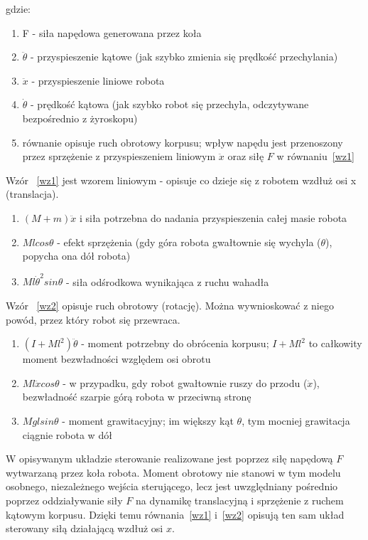 \documentclass[12pt,twoside]{article}
\begin{document}
gdzie:

\begin{enumerate}
    \item[-] F - siła napędowa generowana przez koła
    \item[-] $\ddot{\theta}$ - przyspieszenie kątowe (jak szybko zmienia się prędkość przechylania)
    \item[-] $\ddot{x}$ - przyspieszenie liniowe robota 
    \item[-] $\dot{\theta}$ - prędkość kątowa (jak szybko robot się przechyla, odczytywane bezpośrednio z żyroskopu)
    \item[-] równanie opisuje ruch obrotowy korpusu; wpływ napędu jest przenoszony przez sprzężenie z przyspieszeniem liniowym $\ddot{x}$ oraz siłę $F$ w równaniu~\eqref{wz1}
\end{enumerate}

Wzór ~\ref{wz1} jest wzorem liniowym - opisuje co dzieje się z robotem wzdłuż osi x (translacja). 

\begin{enumerate}
    \item[-] $(M+m)\ddot{x}$ i siła potrzebna do nadania przyspieszenia całej masie robota
    \item[-] $Mlcos\theta$ - efekt sprzężenia (gdy góra robota gwałtownie się wychyla ($\theta$), popycha ona dół robota)
    \item[-] $Ml\dot{\theta}^2sin\theta$ - siła odśrodkowa wynikająca z ruchu wahadła
\end{enumerate}

Wzór ~\ref{wz2} opisuje ruch obrotowy (rotację). Można wywnioskować z niego powód, przez który robot się przewraca.

\begin{enumerate}
    \item[-] $(I+Ml^2)\ddot{\theta}$ - moment potrzebny do obrócenia korpusu; $I+Ml^2$ to całkowity moment bezwładności względem osi obrotu
    \item[-] $Ml\ddot{x}cos\theta$ - w przypadku, gdy robot gwałtownie ruszy do przodu ($\ddot{x}$), bezwładność szarpie górą robota w przeciwną stronę
    \item[-] $Mglsin\theta$ - moment grawitacyjny; im większy kąt $\theta$, tym mocniej grawitacja ciągnie robota w dół
\end{enumerate}

W opisywanym układzie sterowanie realizowane jest poprzez siłę napędową $F$ wytwarzaną przez koła robota. Moment obrotowy nie stanowi w tym modelu osobnego, niezależnego wejścia sterującego, lecz jest uwzględniany pośrednio poprzez oddziaływanie siły $F$ na dynamikę translacyjną i sprzężenie z ruchem kątowym korpusu. Dzięki temu równania~\eqref{wz1} i~\eqref{wz2} opisują ten sam układ sterowany siłą działającą wzdłuż osi $x$.
\end{document}
